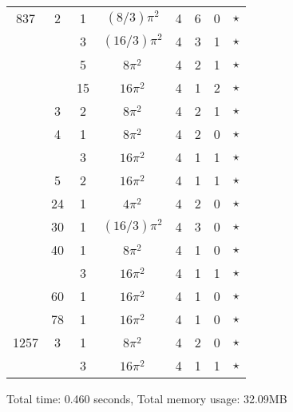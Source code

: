 \begin{tabular}{ccc|ccccc}
837 & 2 & 1 & $(8/3)\pi^2$ & 4 & 6 & 0 & $\star$ \\
 &  & 3 & $(16/3)\pi^2$ & 4 & 3 & 1 & $\star$ \\
 &  & 5 & $8\pi^2$ & 4 & 2 & 1 & $\star$ \\
 &  & 15 & $16\pi^2$ & 4 & 1 & 2 & $\star$ \\
 & 3 & 2 & $8\pi^2$ & 4 & 2 & 1 & $\star$ \\
 & 4 & 1 & $8\pi^2$ & 4 & 2 & 0 & $\star$ \\
 &  & 3 & $16\pi^2$ & 4 & 1 & 1 & $\star$ \\
 & 5 & 2 & $16\pi^2$ & 4 & 1 & 1 & $\star$ \\
 & 24 & 1 & $4\pi^2$ & 4 & 2 & 0 & $\star$ \\
 & 30 & 1 & $(16/3)\pi^2$ & 4 & 3 & 0 & $\star$ \\
 & 40 & 1 & $8\pi^2$ & 4 & 1 & 0 & $\star$ \\
 &  & 3 & $16\pi^2$ & 4 & 1 & 1 & $\star$ \\
 & 60 & 1 & $16\pi^2$ & 4 & 1 & 0 & $\star$ \\
 & 78 & 1 & $16\pi^2$ & 4 & 1 & 0 & $\star$ \\
1257 & 3 & 1 & $8\pi^2$ & 4 & 2 & 0 & $\star$ \\
 &  & 3 & $16\pi^2$ & 4 & 1 & 1 & $\star$ \\
\end{tabular}
Total time: 0.460 seconds, Total memory usage: 32.09MB
